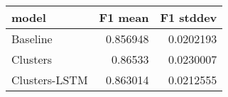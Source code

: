 \begin{tabular}{lrr}
\toprule
 model         &   F1 mean &   F1 stddev \\
\midrule
 Baseline      &  0.856948 &   0.0202193 \\
 Clusters      &  0.86533  &   0.0230007 \\
 Clusters-LSTM &  0.863014 &   0.0212555 \\
\bottomrule
\end{tabular}